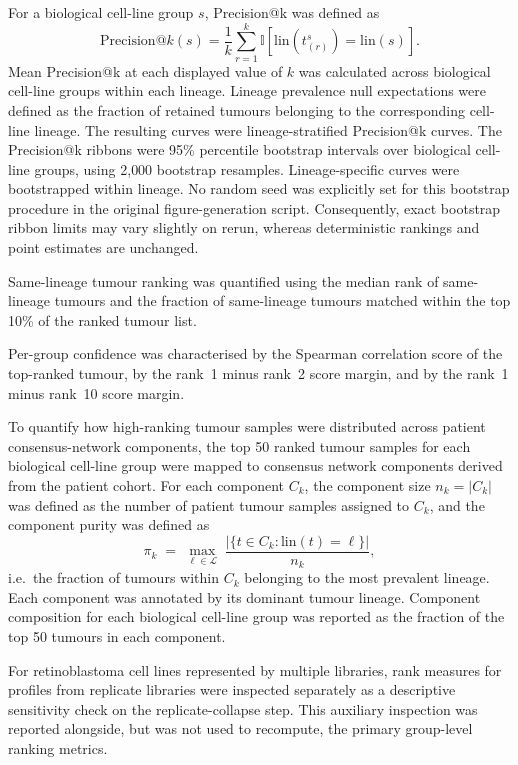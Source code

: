 For a biological cell-line group \(s\), Precision@k was defined as
\[
\mathrm{Precision@}k(s) =
\frac{1}{k}\sum_{r=1}^{k}
\mathbb{I}\!\left[\mathrm{lin}\!\left(t_{(r)}^{s}\right)=\mathrm{lin}(s)\right].
\]
Mean Precision@k at each displayed value of \(k\) was calculated across
biological cell-line groups within each lineage. Lineage prevalence null expectations
were defined as the fraction of retained tumours belonging to the corresponding
cell-line lineage. The resulting curves were lineage-stratified Precision@k
curves. The Precision@k ribbons were 95\% percentile bootstrap
intervals over biological cell-line groups, using 2{,}000 bootstrap resamples.
Lineage-specific curves were bootstrapped within lineage. No random seed was
explicitly set for this bootstrap procedure in the original figure-generation
script. Consequently, exact bootstrap ribbon limits may vary slightly on rerun,
whereas deterministic rankings and point estimates are unchanged.

Same-lineage tumour ranking was quantified using the median rank of
same-lineage tumours and the fraction of same-lineage tumours matched within
the top 10\% of the ranked tumour list.

Per-group confidence was characterised by the Spearman correlation score of the top-ranked tumour, by the rank~1 minus rank~2 score margin, and by the rank~1 minus rank~10 score margin.

To quantify how high-ranking tumour samples were distributed across patient
consensus-network components, the top 50 ranked tumour samples for
each biological cell-line group were mapped to consensus network components
derived from the patient cohort. For each component $C_k$, the component size $n_k = |C_k|$ was defined
as the number of patient tumour samples assigned to $C_k$, and the component
purity was defined as
\[
\pi_k \;=\; \max_{\ell \in \mathcal{L}}\; \frac{|\{ t \in C_k : \mathrm{lin}(t) = \ell \}|}{n_k},
\]
i.e.\ the fraction of tumours within $C_k$ belonging to the most prevalent
lineage. Each component was annotated by its dominant tumour lineage. Component
composition for each biological cell-line group was reported as the fraction of
the top 50 tumours in each component.

For retinoblastoma cell lines represented by multiple libraries, rank measures
for profiles from replicate libraries were inspected separately as a
descriptive sensitivity check on the replicate-collapse step. This auxiliary
inspection was reported alongside, but was not used to recompute, the primary
group-level ranking metrics.

